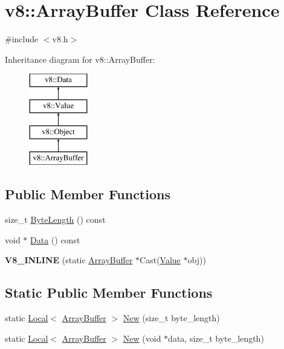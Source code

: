 \hypertarget{classv8_1_1_array_buffer}{}\section{v8\+:\+:Array\+Buffer Class Reference}
\label{classv8_1_1_array_buffer}


{\ttfamily \#include $<$v8.\+h$>$}

Inheritance diagram for v8\+:\+:Array\+Buffer\+:\begin{figure}[H]
\begin{center}
\leavevmode
\includegraphics[height=4.000000cm]{classv8_1_1_array_buffer}
\end{center}
\end{figure}
\subsection*{Public Member Functions}
\begin{DoxyCompactItemize}
\item 
size\+\_\+t \hyperlink{classv8_1_1_array_buffer_ab73b98ba6436b57c5a1b3d29429e0199}{Byte\+Length} () const 
\item 
void $\ast$ \hyperlink{classv8_1_1_array_buffer_af29f607b2a1394799065fdaf75cfaef7}{Data} () const 
\item 
\hypertarget{classv8_1_1_array_buffer_a604dffdc7629e3b952d14016835d7988}{}{\bfseries V8\+\_\+\+I\+N\+L\+I\+N\+E} (static \hyperlink{classv8_1_1_array_buffer}{Array\+Buffer} $\ast$Cast(\hyperlink{classv8_1_1_value}{Value} $\ast$obj))\label{classv8_1_1_array_buffer_a604dffdc7629e3b952d14016835d7988}

\end{DoxyCompactItemize}
\subsection*{Static Public Member Functions}
\begin{DoxyCompactItemize}
\item 
static \hyperlink{classv8_1_1_local}{Local}$<$ \hyperlink{classv8_1_1_array_buffer}{Array\+Buffer} $>$ \hyperlink{classv8_1_1_array_buffer_abd389f38c2e8aa1414e0312baeea9f05}{New} (size\+\_\+t byte\+\_\+length)
\item 
static \hyperlink{classv8_1_1_local}{Local}$<$ \hyperlink{classv8_1_1_array_buffer}{Array\+Buffer} $>$ \hyperlink{classv8_1_1_array_buffer_a7202b761fa822282af79258f0c5e231a}{New} (void $\ast$data, size\+\_\+t byte\+\_\+length)
\end{DoxyCompactItemize}


